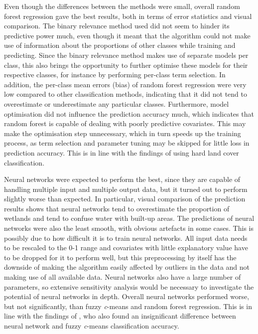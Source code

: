 \documentclass[a4paper,12pt]{scrbook}
\begin{document}
Even though the differences between the methods were small, overall random forest regression gave the best results, both in terms of error statistics and visual comparison. The binary relevance method used did not seem to hinder its predictive power much, even though it meant that the algorithm could not make use of information about the proportions of other classes while training and predicting. Since the binary relevance method makes use of separate models per class, this also brings the opportunity to further optimise these models for their respective classes, for instance by performing per-class term selection. In addition, the per-class mean errors (bias) of random forest regression were very low compared to other classification methods, indicating that it did not tend to overestimate or underestimate any particular classes. Furthermore, model optimisation did not influence the prediction accuracy much, which indicates that random forest is capable of dealing with poorly predictive covariates. This may make the optimisation step unnecessary, which in turn speeds up the training process, as term selection and parameter tuning may be skipped for little loss in prediction accuracy. This is in line with the findings of \citet{Pelletier2016hardrf} using hard land cover classification.

Neural networks were expected to perform the best, since they are capable of handling multiple input and multiple output data, but it turned out to perform slightly worse than expected. In particular, visual comparison of the prediction results shows that neural networks tend to overestimate the proportion of wetlands and tend to confuse water with built-up areas. The predictions of neural networks were also the least smooth, with obvious artefacts in some cases. This is possibly due to how difficult it is to train neural networks. All input data needs to be rescaled to the 0-1 range and covariates with little explanatory value have to be dropped for it to perform well, but this preprocessing by itself has the downside of making the algorithm easily affected by outliers in the data and not making use of all available data. Neural networks also have a large number of parameters, so extensive sensitivity analysis would be necessary to investigate the potential of neural networks in depth. Overall neural networks performed worse, but not significantly, than fuzzy \textit{c}-means and random forest regression. This is in line with the findings of \citet{zhang2001fullyfuzzy}, who also found an insignificant difference between neural network and fuzzy \textit{c}-means classification accuracy.
\end{document}
